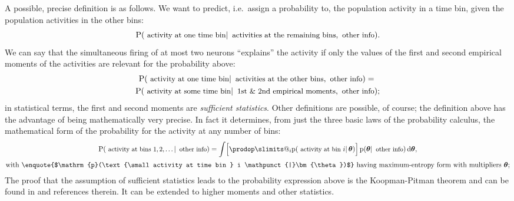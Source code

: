 \documentclass{article}
\makeatletter
\theoremstyle{remark}
\theoremstyle{innote}
\def\prod{\DOTSI\prodop\slimits@}
\newcommand*{\citep}{\parencites}
\renewcommand*{\cite}{\citep}
\newcommand*{\amp}{\&}
\newcommand*{\di}{\mathrm{d}}%
\renewcommand*{\|}{\mathpunct{|}}%
\newcommand*{\pf}{\mathrm{p}}%
\newcommand*{\p}{\mathrm{P}}%
\newcommand*{\sect}{\S}%
\newcommand*{\ie}{{i.e.}}
\theoremstyle{simple}
\newcommand*{\ytheta}{\bm{\theta}}
\makeatother
\begin{document}
A possible, precise definition is as follows. We want to predict, \ie\
assign a probability to, the population activity in a time bin, given the
population activities in the other bins:
\begin{equation}
  \label{eq:general_prediction}
  \p(\text{\small activity at one time bin} \|
  \text{\small activities at the remaining bins},\text{\small other info}).
\end{equation}
We can say that the simultaneous firing of at most two neurons
\enquote{explains} the activity if only the values of the first and second
empirical moments of the activities are relevant for the probability above:
\begin{multline}
  \label{eq:informal_sufficiency}
  \p(\text{\small activity at one time bin} \|
  \text{\small activities at the other bins},\text{\small other info}) ={}\\
  \p(\text{\small activity at some time bin} \|
  \text{\small 1st \amp\ 2nd empirical moments},\text{\small other info});
\end{multline}
in statistical terms, the first and second moments are \emph{sufficient
  statistics}. Other definitions are possible, of course; the definition
above has the advantage of being mathematically very precise. In fact it
determines, from just the three basic laws of the probability calculus, the
mathematical form of the probability for the activity at any number of bins:
\begin{equation}
  \label{eq:sufficiency_maxent_family}
  \begin{gathered}
  \p(\text{\small activity at bins $1,2,\dotsc$} \|
  \text{\small other info}) =
  \int\Bigl[\prod_i 
    \pf(\text{\small activity at bin } i \|\ytheta) \Bigr]\,
 \pf(\ytheta\| \text{\small other info})\,
  \di\ytheta,
  \\[\jot]
  \text{with \enquote{$\pf(\text{\small activity at time bin } i \|\ytheta)$}
    having maximum-entropy form with multipliers $\ytheta$};
\end{gathered}
\end{equation}
The proof that the assumption of sufficient statistics leads
to the probability expression above is the Koopman-Pitman theorem
\cite{koopman1936,pitman1936,darmois1935} and can be found in
\textcite[\sect~4.5]{bernardoetal1994_r2000} and references therein. It can
be extended to higher moments and other statistics.
\end{document}
